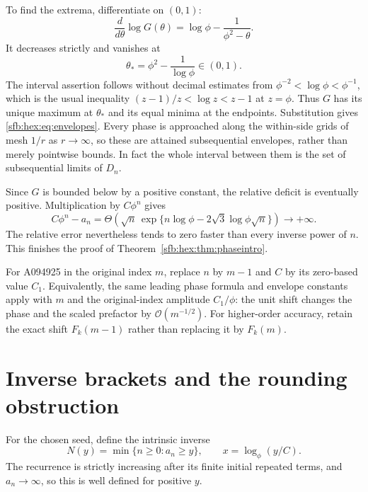 \documentclass[11pt]{article}
\theoremstyle{remark}\newtheorem{remark}[theorem]{Remark}
\newcommand{\OO}{\mathcal O}
\begin{document}
To find the extrema, differentiate on $(0,1)$:
\begin{equation}\label{sfb:hex:eq:Gderivative}
 \frac{d}{d\theta}\log G(\theta)
 =\log\phi-\frac1{\phi^2-\theta}.
\end{equation}
It decreases strictly and vanishes at
\begin{equation}\label{sfb:hex:eq:thetamax}
 \theta_* =\phi^2-\frac1{\log\phi}\in(0,1).
\end{equation}
The interval assertion follows without decimal estimates from
$\phi^{-2}<\log\phi<\phi^{-1}$, which is the usual inequality
$(z-1)/z<\log z<z-1$ at $z=\phi$. Thus $G$ has its unique maximum at $\theta_*$ and its equal minima at the endpoints. Substitution gives \eqref{sfb:hex:eq:envelopes}. Every phase is approached along the within-side grids of mesh $1/r$ as $r\to\infty$, so these are attained subsequential envelopes, rather than merely pointwise bounds. In fact the whole interval between them is the set of subsequential limits of $D_n$.

Since $G$ is bounded below by a positive constant, the relative deficit is eventually positive. Multiplication by $C\phi^n$ gives
\[
 C\phi^n-a_n
 =\Theta\!\left(\sqrt n\,\exp\{n\log\phi-2\sqrt3\log\phi\sqrt n\}\right)
 \longrightarrow+\infty.
\]
The relative error nevertheless tends to zero faster than every inverse power of $n$. This finishes the proof of Theorem~\ref{sfb:hex:thm:phaseintro}.

For A094925 in the original index $m$, replace $n$ by $m-1$ and $C$ by its zero-based value $C_1$. Equivalently, the same leading phase formula and envelope constants apply with $m$ and the original-index amplitude $C_1/\phi$: the unit shift changes the phase and the scaled prefactor by $\OO(m^{-1/2})$. For higher-order accuracy, retain the exact shift $F_k(m-1)$ rather than replacing it by $F_k(m)$.

\section{Inverse brackets and the rounding obstruction}\label{sfb:hex:sec:inverse}
For the chosen seed, define the intrinsic inverse
\begin{equation}\label{sfb:hex:eq:N}
 N(y)=\min\{n\ge0:a_n\ge y\},\qquad
 x=\log_\phi(y/C).
\end{equation}
The recurrence is strictly increasing after its finite initial repeated terms, and $a_n\to\infty$, so this is well defined for positive $y$.
\end{document}
